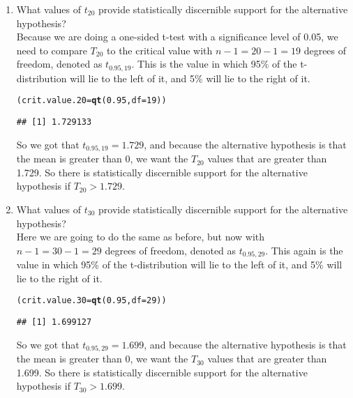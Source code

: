 \documentclass{article}\usepackage[]{graphicx}\usepackage[]{xcolor}
\makeatletter
\newcommand{\hlnum}[1]{\textcolor[rgb]{0.686,0.059,0.569}{#1}}%
\newcommand{\hldef}[1]{\textcolor[rgb]{0.345,0.345,0.345}{#1}}%
\newcommand{\hlkwb}[1]{\textcolor[rgb]{0.69,0.353,0.396}{#1}}%
\newcommand{\hlkwc}[1]{\textcolor[rgb]{0.333,0.667,0.333}{#1}}%
\newcommand{\hlkwd}[1]{\textcolor[rgb]{0.737,0.353,0.396}{\textbf{#1}}}%
\newenvironment{kframe}{%
 \def\at@end@of@kframe{}%
 \ifinner\ifhmode%
  \def\at@end@of@kframe{\end{minipage}}%
  \begin{minipage}{\columnwidth}%
 \fi\fi%
 \def\FrameCommand##1{\hskip\@totalleftmargin \hskip-\fboxsep
 \colorbox{shadecolor}{##1}\hskip-\fboxsep
     \hskip-\linewidth \hskip-\@totalleftmargin \hskip\columnwidth}%
 \MakeFramed {\advance\hsize-\width
   \@totalleftmargin\z@ \linewidth\hsize
   \@setminipage}}%
 {\par\unskip\endMakeFramed%
 \at@end@of@kframe}
\newenvironment{knitrout}{}{} %
\makeatother
\begin{document}
\begin{enumerate}
\begin{enumerate}
  \item What values of $t_{20}$ provide statistically discernible support for the
  alternative hypothesis? \\
Because we are doing a one-sided t-test with a significance level of 0.05, we need to compare $T_{20}$ to the critical value with $n-1=20-1=19$ degrees of freedom, denoted as $t_{0.95, 19}$. This is the value in which 95\% of the t-distribution will lie to the left of it, and 5\% will lie to the right of it. 
\begin{knitrout}
\color{fgcolor}\begin{kframe}
\begin{alltt}
\hldef{(crit.value.20} \hlkwb{=} \hlkwd{qt}\hldef{(}\hlnum{0.95}\hldef{,} \hlkwc{df}\hldef{=}\hlnum{19}\hldef{))}
\end{alltt}
\begin{verbatim}
## [1] 1.729133
\end{verbatim}
\end{kframe}
\end{knitrout}
So we got that $t_{0.95, 19} = 1.729$, and because the alternative hypothesis is that the mean is greater than 0, we want the $T_{20}$ values that are greater than 1.729. So there is statistically discernible support for the alternative hypothesis if $T_{20} > 1.729.$
  \item What values of $t_{30}$ provide statistically discernible support for the
  alternative hypothesis? \\
Here we are going to do the same as before, but now with $n-1=30-1=29$ degrees of freedom, denoted as $t_{0.95, 29}$. This again is the value in which 95\% of the t-distribution will lie to the left of it, and 5\% will lie to the right of it.
\begin{knitrout}
\color{fgcolor}\begin{kframe}
\begin{alltt}
\hldef{(crit.value.30} \hlkwb{=} \hlkwd{qt}\hldef{(}\hlnum{0.95}\hldef{,} \hlkwc{df}\hldef{=}\hlnum{29}\hldef{))}
\end{alltt}
\begin{verbatim}
## [1] 1.699127
\end{verbatim}
\end{kframe}
\end{knitrout}
So we got that $t_{0.95, 29} = 1.699$, and because the alternative hypothesis is that the mean is greater than 0, we want the $T_{30}$ values that are greater than 1.699. So there is statistically discernible support for the alternative hypothesis if $T_{30} > 1.699.$

\end{enumerate}
\end{enumerate}
\end{document}
